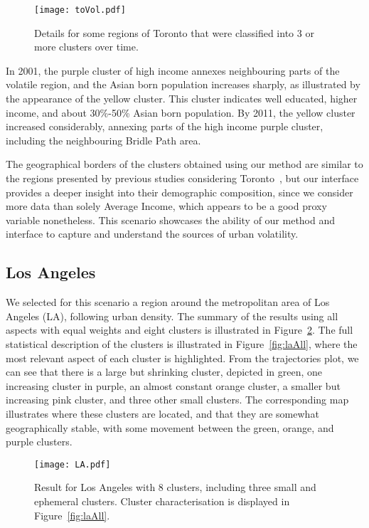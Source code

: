 \begin{figure}
    \centering 
    \texttt{[image: toVol.pdf]}
    \caption{Details for some regions of Toronto that were classified into 3 or
         more clusters over time.\label{fig:toVol}}
\end{figure}

In 2001, the purple cluster of high income annexes neighbouring parts of the
volatile region, and the Asian born population increases sharply, as illustrated
by the appearance of the yellow cluster.  This cluster indicates well educated,
higher income, and about 30\%-50\% Asian born population. By 2011, the yellow
cluster increased considerably, annexing parts of the high income purple
cluster, including the neighbouring Bridle Path area.

The geographical borders of the clusters obtained using our method are similar
to the regions presented by previous studies considering
Toronto~\citep{hulchanski2007three}, but our interface provides a deeper insight
into their demographic composition, since we consider more data than solely
Average Income, which appears to be a good proxy variable nonetheless. This
scenario showcases the ability of our method and interface to capture and
understand the sources of urban volatility.

\subsection{Los Angeles}

We selected for this scenario a region around the metropolitan area of Los
Angeles (LA), following urban density. The summary of the results using all
aspects with equal weights and eight clusters is illustrated in
Figure~\ref{fig:la}. The full statistical description of the clusters is
illustrated in Figure~\ref{fig:laAll}, where the most relevant aspect of each
cluster is highlighted. From the trajectories plot, we can see that there is a
large but shrinking cluster, depicted in green, one increasing cluster in
purple, an almost constant orange cluster, a smaller but increasing pink
cluster, and three other small clusters. The corresponding map illustrates where
these clusters are located, and that they are somewhat geographically stable,
with some movement between the green, orange, and purple clusters.

\begin{figure}
    \centering 
    \texttt{[image: LA.pdf]}
    \caption{Result for Los Angeles with 8 clusters, including three small and
        ephemeral clusters. Cluster characterisation is displayed
        in Figure~\ref{fig:laAll}.\label{fig:la}}
\end{figure}

